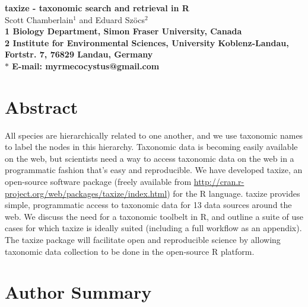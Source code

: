 \documentclass[10pt]{article}\usepackage{graphicx, color}
\date{}
\begin{document}
\begin{flushleft}
{\Large
\textbf{taxize - taxonomic search and retrieval in R}
}
\\
Scott Chamberlain$^{1}$ and 
Eduard Sz\"{o}cs$^{2}$
\\
\bf{1} Biology Department, Simon Fraser University, Canada
\\
\bf{2} Institute for Environmental Sciences, University Koblenz-Landau, Fortstr. 7, 76829 Landau, Germany
\\
$\ast$ E-mail: myrmecocystus@gmail.com
\end{flushleft}

\section*{Abstract}
All species are hierarchically related to one another, and we use taxonomic names to label the nodes in this hierarchy. Taxonomic data is becoming easily available on the web, but scientists need a way to access taxonomic data on the web in a programmatic fashion that's easy and reproducible. We have developed taxize, an open-source software package (freely available from \url{http://cran.r-project.org/web/packages/taxize/index.html}) for the R language. taxize provides simple, programmatic access to taxonomic data for 13 data sources around the web. We discuss the need for a taxonomic toolbelt in R, and outline a suite of use cases for which taxize is ideally suited (including a full workflow as an appendix). The taxize package will facilitate open and reproducible science by allowing taxonomic data collection to be done in the open-source R platform.

\section*{Author Summary}
\end{document}
